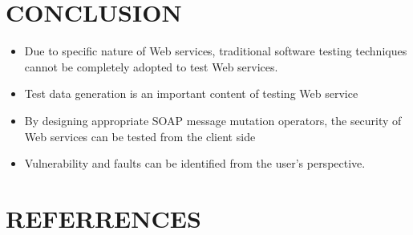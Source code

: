 \documentclass{bredelebeamer}
\begin{document}
\section{CONCLUSION}
\begin{frame}
\end{frame}


\begin{frame}
	\begin{itemize}
		\large
		\item Due to specific nature of Web services, traditional software testing techniques cannot be completely adopted
		to test Web services.
		\newline
		\item Test data generation is an important content of testing Web	service
		\newline
		\item By designing appropriate SOAP message mutation operators, the security of Web services can be tested from the client side
		\newline
		\item Vulnerability and faults can be identified from the
		user’s perspective.
		\newline
	\end{itemize}
\end{frame}

\section*{REFERRENCES}
\begin{frame}
\end{frame}
\end{document}
